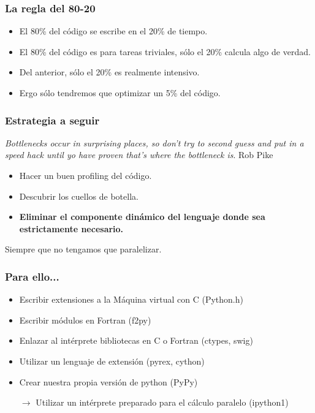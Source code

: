 \documentclass{beamer}
\begin{document}
\begin{frame}
  \frametitle{La regla del 80-20}
  \begin{itemize}
  \item El 80\% del código se escribe en el 20\% de tiempo.
  \item El 80\% del código es para tareas triviales, sólo el 20\%
    calcula algo de verdad.
  \item Del anterior, sólo el 20\% es realmente intensivo.
  \item Ergo sólo tendremos que optimizar un 5\% del código.
  \end{itemize}
\end{frame}

\begin{frame}
  \frametitle{Estrategia a seguir}
  \begin{flushright}
    \textit{Bottlenecks occur in surprising places, so don't try to
      second guess and put in a speed hack until yo have proven that's
      where the bottleneck is}. Rob Pike
  \end{flushright}
  \vspace{1cm}
  \begin{itemize}
  \item Hacer un buen profiling del código.
  \item Descubrir los cuellos de botella.
  \item \textbf{Eliminar el componente dinámico del lenguaje donde sea
    estrictamente necesario.}
  \end{itemize}
\end{frame}

\begin{frame}
  \begin{center}
    \begin{Huge}
      Siempre que no tengamos que paralelizar.
    \end{Huge}
  \end{center}
\end{frame}


\begin{frame}
  \frametitle{Para ello...}
  \begin{itemize}
  \item Escribir extensiones a la Máquina virtual con C (Python.h)
  \item Escribir módulos en Fortran (f2py)
  \item Enlazar al intérprete bibliotecas en C o Fortran (ctypes,
    swig)
  \item Utilizar un lenguaje de extensión (pyrex, cython)
  \item Crear nuestra propia versión de python (PyPy)
  \item[$\rightarrow$] Utilizar un intérprete preparado para el cálculo paralelo
    (ipython1)
  \end{itemize}
\end{frame}
\end{document}
